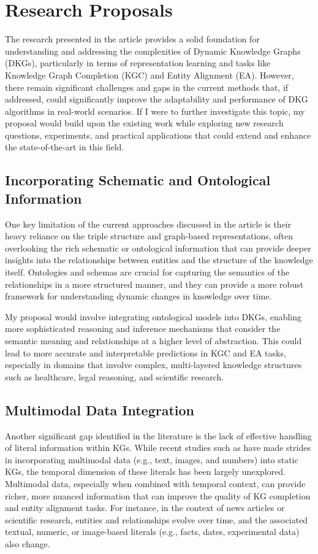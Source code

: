 \section{Research Proposals}

The research presented in the article provides a solid foundation for understanding and addressing the complexities of Dynamic Knowledge Graphs (DKGs), particularly in terms of representation 
learning and tasks like Knowledge Graph Completion (KGC) and Entity Alignment (EA). However, there remain significant challenges and gaps in the current methods that, if addressed, could 
significantly improve the adaptability and performance of DKG algorithms in real-world scenarios. If I were to further investigate this topic, my proposal would build upon the existing work 
while exploring new research questions, experiments, and practical applications that could extend and enhance the state-of-the-art in this field.

\subsection{Incorporating Schematic and Ontological Information}

One key limitation of the current approaches discussed in the article is their heavy reliance on the triple structure and graph-based representations, often overlooking the rich schematic 
or ontological information that can provide deeper insights into the relationships between entities and the structure of the knowledge itself. Ontologies and schemas are crucial for capturing 
the semantics of the relationships in a more structured manner, and they can provide a more robust framework for understanding dynamic changes in knowledge over time. 

My proposal would involve integrating ontological models into DKGs, enabling more sophisticated reasoning and inference mechanisms that consider the semantic meaning and relationships at a 
higher level of abstraction. This could lead to more accurate and interpretable predictions in KGC and EA tasks, especially in domains that involve complex, multi-layered knowledge structures 
such as healthcare, legal reasoning, and scientific research.

\subsection{Multimodal Data Integration}

Another significant gap identified in the literature is the lack of effective handling of literal information within KGs. While recent studies such as \cite{alam2024semantical} 
have made strides in incorporating multimodal data (e.g., text, images, and numbers) into static KGs, the temporal dimension of these literals has been largely unexplored. Multimodal data, 
especially when combined with temporal context, can provide richer, more nuanced information that can improve the quality of KG completion and entity alignment tasks. For instance, in the 
context of news articles or scientific research, entities and relationships evolve over time, and the associated textual, numeric, or image-based literals (e.g., facts, dates, experimental data)
also change. 

